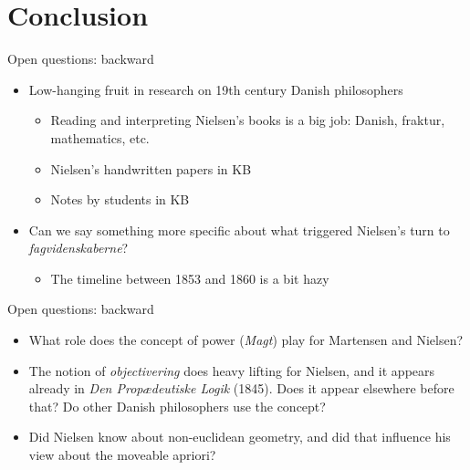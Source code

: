 \documentclass[ignorenonframetext, ]{beamer}
\begin{document}
\section{Conclusion}

\begin{frame}{Open questions: backward}
\begin{itemize}
\item Low-hanging fruit in research on 19th century Danish
  philosophers

  \begin{itemize}
  \item Reading and interpreting Nielsen's books is a big job: Danish,
    fraktur, mathematics, etc.
  \item Nielsen's handwritten papers in KB
  \item Notes by students in KB
  \end{itemize}
\item Can we say something more specific about what triggered
  Nielsen's turn to \emph{fagvidenskaberne}?

  \begin{itemize}
  \item The timeline between 1853 and 1860 is a bit hazy
  \end{itemize}
\end{itemize}
\end{frame}

\begin{frame}{Open questions: backward}

\begin{itemize}
\item What role does the concept of power (\emph{Magt}) play for
  Martensen and Nielsen?
\item The notion of \emph{objectivering} does heavy lifting for
  Nielsen, and it appears already in \emph{Den Propædeutiske Logik}
  (1845). Does it appear elsewhere before that? Do other Danish
  philosophers use the concept?
\item Did Nielsen know about non-euclidean geometry, and did that
  influence his view about the moveable apriori?
\end{itemize}
\end{frame}
\end{document}
